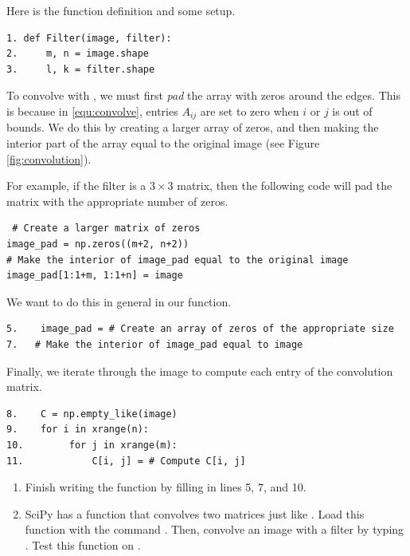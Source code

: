 Here is the function definition and some setup.
\begin{lstlisting}
1. def Filter(image, filter):
2.     m, n = image.shape
3.     l, k = filter.shape
\end{lstlisting}
To convolve  with , we must first \emph{pad} the array  with zeros around the edges.
This is because in \eqref{equ:convolve}, entries $A_{ij}$ are set to zero when $i$ or $j$ is out of bounds.
We do this by creating a larger array of zeros, and then making the interior part of the array equal to the original image (see Figure \ref{fig:convolution}).

For example, if the filter is a $3 \times 3$ matrix, then the following code will pad the matrix with the appropriate number of zeros.
\begin{lstlisting}
 # Create a larger matrix of zeros
image_pad = np.zeros((m+2, n+2))
# Make the interior of image_pad equal to the original image
image_pad[1:1+m, 1:1+n] = image
\end{lstlisting}
We want to do this in general in our function.
\begin{lstlisting}
5.    image_pad = # Create an array of zeros of the appropriate size
7.   # Make the interior of image_pad equal to image
\end{lstlisting}

Finally, we iterate through the image to compute each entry of the convolution matrix.
\begin{lstlisting}
8.    C = np.empty_like(image)
9.    for i in xrange(n):
10.        for j in xrange(m):
11.            C[i, j] = # Compute C[i, j]
\end{lstlisting}


\begin{problem}\label{prob:filter}
\leavevmode
\begin{enumerate}
\item Finish writing the function  by filling in lines 5, 7, and 10. 
\item SciPy has a function that convolves two matrices just like .
Load this function with the command . 
Then, convolve an image  with a filter  by typing .
Test this function on .
\end{enumerate}
\end{problem}

